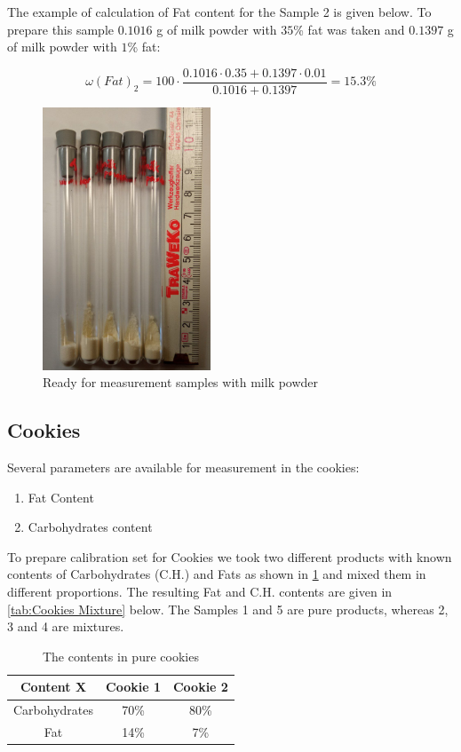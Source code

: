 \documentclass[a4paper,12pt]{article}
\begin{document}
The example of calculation of Fat content for the Sample 2 is given below. To prepare this sample $0.1016$ g of milk powder with $35$\% fat was taken and $0.1397$ g of milk powder with $1$\% fat:

\begin{equation}
    \omega(Fat)_2 = 100 \cdot \frac{0.1016 \cdot 0.35 + 0.1397 \cdot 0.01}{0.1016 + 0.1397} = 15.3\%
\end{equation}

\begin{figure}[H]
\centering
\includegraphics[width=5cm]{milk.jpg}
\caption{Ready for measurement samples with milk powder}
\label{fig:milk}
\end{figure}

\subsection{Cookies}
\label{sec:Cookies}

Several parameters are available for measurement in the cookies:
\begin{enumerate}
    \item Fat Content
    \item Carbohydrates content
\end{enumerate}

To prepare calibration set for Cookies we took two different products with known contents of Carbohydrates (C.H.) and Fats as shown in \cref{tab:Cookies Pure}  and mixed them in different proportions. 
The resulting Fat and C.H. contents are given in \cref{tab:Cookies Mixture} below.
The Samples 1 and 5 are pure products, whereas 2, 3 and 4 are mixtures.

\begin{table}[ht!]
\centering
\caption{The contents in pure cookies}
\label{tab:Cookies Pure}
\begin{tabular}{|c|c|c|}
\hline
Content   X   & Cookie 1 & Cookie 2 \\ \hline
Carbohydrates & 70\%      & 80\%      \\ \hline
Fat           & 14\%      & 7\%       \\ \hline
\end{tabular}
\end{table}
\end{document}
